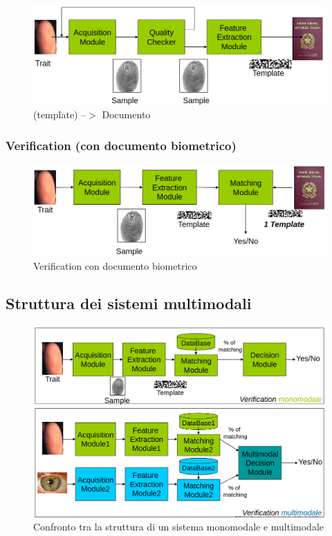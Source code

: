 \begin{figure}[ht]
    \centering
    \includegraphics[width=0.95\linewidth]{chapters/images-chap2/enroll-doc.png}
    \caption{(template) --$>$ Documento}
    \label{fig:enroll-doc}
\end{figure}

\newpage
\subsubsection{Verification (con documento biometrico)}

\begin{figure}[ht]
    \centering
    \includegraphics[width=0.95\linewidth]{chapters/images-chap2/verification-doc.png}
    \caption{Verification con documento biometrico}
    \label{fig:enter-label}
\end{figure}

\subsection{Struttura dei sistemi multimodali}

\begin{figure}[ht]
    \centering
    \includegraphics[width=0.95\linewidth]{chapters/images-chap2/multimodali.png}
    \caption{Confronto tra la struttura di un sistema monomodale e multimodale}
    \label{fig:multimodal}
\end{figure}

